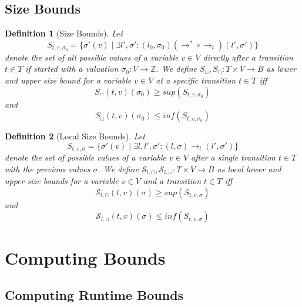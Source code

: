 \documentclass{scrartcl}
\newtheorem{definition}{Definition}
\begin{document}
\subsection{Size Bounds}

\begin{definition}[Size Bounds]
	Let 
	\[ S_{t, v, \sigma_0} = \lbrace \sigma'(v) \mid \exists l', \sigma': (l_0, \sigma_0) (\rightarrow^* \circ \rightarrow_t) (l', \sigma') \rbrace \]
	denote the set of all possible values of a variable $v \in V$ directly after a transition $t \in T$ if started with a valuation $\sigma_0: V \rightarrow \mathbb{Z}$.
	We define $S_\sqcup, S_\sqcap: T \times V \rightarrow B$ as lower and upper size bound for a variable $v \in V$ at a specific transition $t \in T$ iff
	\[ S_\sqcap(t, v)(\sigma_0) \geq \mathit{sup}(S_{t, v, \sigma_0}) \]
	and 
	\[ S_\sqcup(t, v)(\sigma_0) \leq \mathit{inf}(S_{t, v, \sigma_0}) \]
\end{definition}

\begin{definition}[Local Size Bounds]
	Let
	\[ S_{t, v, \sigma} = \lbrace \sigma'(v) \mid \exists l, l', \sigma': (l, \sigma) \rightarrow_t (l', \sigma') \rbrace \]
	denote the set of possible values of a variable $v \in V$ after a single transition $t \in T$ with the previous values $\sigma$.
	We define $\mathcal{S}_{l,\sqcap}, \mathcal{S}_{l,\sqcup}: T \times V \rightarrow B$ as local lower and upper size bounds for a variable $v \in V$ and a transition $t \in T$ iff
	\[ \mathcal{S}_{l,\sqcap}(t, v)(\sigma) \geq \mathit{sup}(S_{t, v, \sigma}) \]
	and
	\[ \mathcal{S}_{l,\sqcup}(t, v)(\sigma) \leq \mathit{inf}(S_{t, v, \sigma}) \]	
\end{definition}

\section{Computing Bounds}

\subsection{Computing Runtime Bounds}
\end{document}
